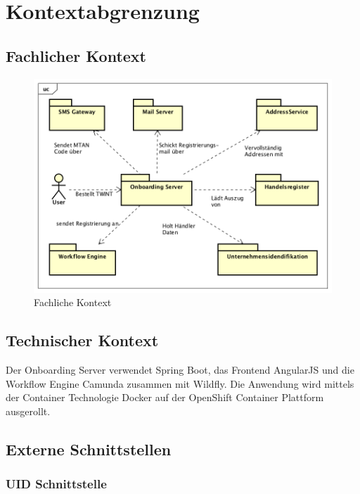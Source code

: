 \graphicspath{{./images/}}

\chapter{Kontextabgrenzung}

\section{Fachlicher Kontext}

\begin{figure}[H]
	\centering
	\includegraphics[scale=0.6]{Contextdiagramm.png}
	\caption{Fachliche Kontext}
\end{figure}

\section{Technischer Kontext}

Der Onboarding Server verwendet Spring Boot, das Frontend AngularJS und die Workflow Engine Camunda zusammen mit Wildfly. Die Anwendung wird mittels der Container Technologie Docker auf der OpenShift Container Plattform ausgerollt. 

\section{Externe Schnittstellen}

\subsection{UID Schnittstelle}

